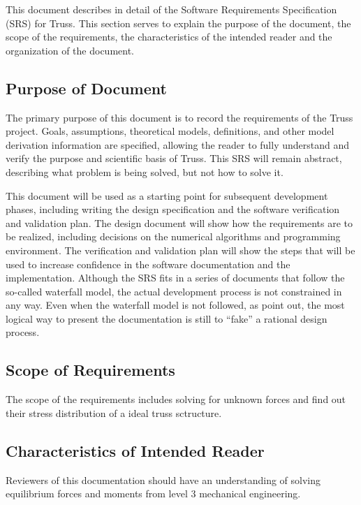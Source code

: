 \documentclass[12pt]{article}
\begin{document}
This document describes in detail of the Software Requirements Specification 
(SRS) for Truss. This section serves to explain the purpose of the document, 
the scope of the requirements, the characteristics of the intended reader and 
the organization of the document.

\subsection{Purpose of Document}

The primary purpose of this document is to record the requirements of the Truss 
project. Goals, assumptions, theoretical models, definitions, and other model 
derivation information are specified, allowing the reader to fully understand 
and verify the purpose and scientific basis of Truss. This SRS will remain 
abstract, describing what problem is being solved, but not how to solve 
it.

This document will be used as a starting point for subsequent development 
phases, including writing the design specification and the software 
verification and validation plan. The design document will show how the 
requirements are to be realized, including decisions on the numerical 
algorithms and programming environment. The verification and validation plan 
will show the steps that will be used to increase confidence in the software 
documentation and the implementation. Although the SRS fits in a series of 
documents that follow the so-called waterfall model, the actual development 
process is not constrained in any way. Even when the waterfall model is not 
followed, as \cite{ParnasandClements} point out, the most logical way to 
present the documentation is still to “fake” a rational design process.

\subsection{Scope of Requirements} 
The scope of the requirements includes solving for unknown forces and find out 
their stress distribution of a ideal truss sctructure.

\subsection{Characteristics of Intended Reader} \label{sec_IntendedReader}
Reviewers of this documentation should have an understanding of solving 
equilibrium forces and moments from level 3 mechanical engineering.
\end{document}
